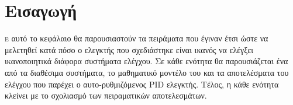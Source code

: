 


\section{Εισαγωγή}

\lettrine[findent=2pt]{}{ε} αυτό το κεφάλαιο θα παρουσιαστούν τα πειράματα που έγιναν έτσι ώστε να μελετηθεί κατά πόσο ο ελεγκτής που σχεδιάστηκε είναι ικανός να ελέγξει ικανοποιητικά διάφορα συστήματα ελέγχου. Σε κάθε ενότητα θα παρουσιάζεται ένα από τα διαθέσιμα συστήματα, το μαθηματικό μοντέλο του και τα αποτελέσματα του ελέγχου που παρέχει ο αυτο-ρυθμιζόμενος PID ελεγκτής. Τέλος, η κάθε ενότητα κλείνει με το σχολιασμό των πειραματικών αποτελεσμάτων.
